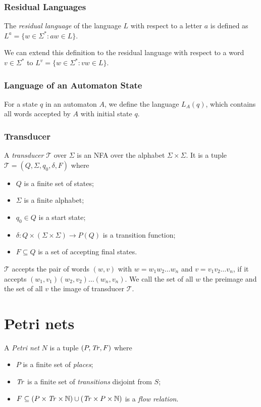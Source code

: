 \subsubsection{Residual Languages}

The \emph{residual language} of the language $L$ with respect to a letter $a$ is defined as \break
$L^{a} = \{ w \in \Sigma^{*} : aw \in L \}$.

We can extend this definition to the residual language with respect to a word $v \in \Sigma^{*}$ to \break
$L^{v} = \{ w \in \Sigma^{*} : vw \in L \}$.

\subsubsection{Language of an Automaton State}

For a state $q$ in an automaton $A$, we define the language $L_{A}(q)$, which contains all words accepted by $A$ with initial state $q$.

\subsubsection{Transducer}

A \emph{transducer} $\mathcal{T}$ over $\Sigma$ is an NFA over the alphabet $\Sigma \times \Sigma$. 
It is a tuple $\mathcal{T} = (Q,\Sigma,q_{0},\delta,F)$ where 
\begin{itemize}[-,noitemsep]
\item $Q$ is a finite set of states;
\item $\Sigma$ is a finite alphabet;
\item $q_{0} \in Q$ is a start state;
\item $\delta : Q \times (\Sigma \times \Sigma) \rightarrow P(Q)$ is a transition function;
\item $F \subseteq Q$ is a set of accepting final states.
\end{itemize}
$\mathcal{T}$ accepts the pair of words $(w,v)$ with $w = w_{1}w_{2} \ldots w_{n}$ and $v=v_{1}v_{2} \ldots v_{n}$, if it accepts $(w_{1},v_{1})(w_{2},v_{2}) \ldots (w_{n},v_{n})$.
We call the set of all $w$ the preimage and the set of all $v$ the image of transducer $\mathcal{T}$.


\section{Petri nets}

A \emph{Petri net} $N$ is a tuple $(P,\mathit{Tr},F)$ where 
\begin{itemize}[-,noitemsep]
	\item $P$ is a finite set of \emph{places};
	\item $\mathit{Tr}$ is a finite set of \emph{transitions} disjoint from $S$;
	\item $F \subseteq (P \times \mathit{Tr} \times \mathbb{N}) \cup (\mathit{Tr} \times P \times \mathbb{N})$ is a \emph{flow relation}.
\end{itemize}

